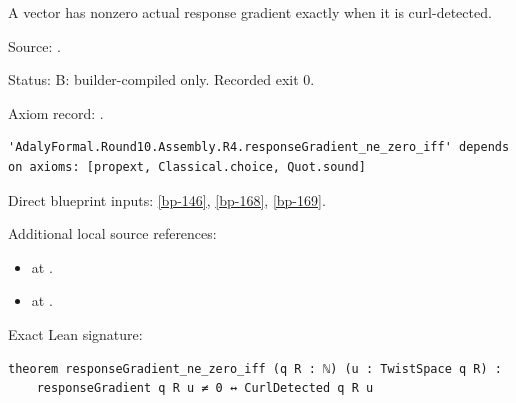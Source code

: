 \begin{theorem}[bp-174]
\label{bp-174}
\leanok
A vector has nonzero actual response gradient exactly when it is curl-detected.

\par Source: \texttt{}.
\par Status: B: builder-compiled only. Recorded exit 0.
\par Axiom record: \texttt{}.
\begin{verbatim}
'AdalyFormal.Round10.Assembly.R4.responseGradient_ne_zero_iff' depends on axioms: [propext, Classical.choice, Quot.sound]
\end{verbatim}
\par Direct blueprint inputs: \ref{bp-146}, \ref{bp-168}, \ref{bp-169}.
\par Additional local source references:
\begin{itemize}
\item \texttt{} at \texttt{}.
\item \texttt{} at \texttt{}.
\end{itemize}
\par Exact Lean signature:
\begin{verbatim}
theorem responseGradient_ne_zero_iff (q R : ℕ) (u : TwistSpace q R) :
    responseGradient q R u ≠ 0 ↔ CurlDetected q R u
\end{verbatim}
\end{theorem}

